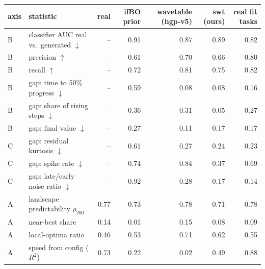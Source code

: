 \begin{tabular}{llrrrrr}
\toprule
axis & statistic & real & ifBO prior & wavetable (hgp-v5) & swt (ours) & real fit tasks \\
\midrule
B & classifier AUC real vs.\ generated $\downarrow$ & -- & 0.91 & 0.87 & 0.89 & 0.82 \\
B & precision $\uparrow$ & -- & 0.61 & 0.70 & 0.66 & 0.80 \\
B & recall $\uparrow$ & -- & 0.72 & 0.81 & 0.75 & 0.82 \\
B & gap: time to 50\% progress $\downarrow$ & -- & 0.59 & 0.08 & 0.08 & 0.16 \\
B & gap: share of rising steps $\downarrow$ & -- & 0.36 & 0.31 & 0.05 & 0.27 \\
B & gap: final value $\downarrow$ & -- & 0.27 & 0.11 & 0.17 & 0.17 \\
\midrule
C & gap: residual kurtosis $\downarrow$ & -- & 0.61 & 0.27 & 0.24 & 0.23 \\
C & gap: spike rate $\downarrow$ & -- & 0.74 & 0.84 & 0.37 & 0.69 \\
C & gap: late/early noise ratio $\downarrow$ & -- & 0.92 & 0.28 & 0.17 & 0.14 \\
\midrule
A & landscape predictability $\rho_{200}$ & 0.77 & 0.73 & 0.78 & 0.71 & 0.78 \\
A & near-best share & 0.14 & 0.01 & 0.15 & 0.08 & 0.09 \\
A & local-optima ratio & 0.46 & 0.53 & 0.71 & 0.62 & 0.55 \\
A & speed from config ($R^2$) & 0.73 & 0.22 & 0.02 & 0.49 & 0.88 \\
\bottomrule
\end{tabular}
